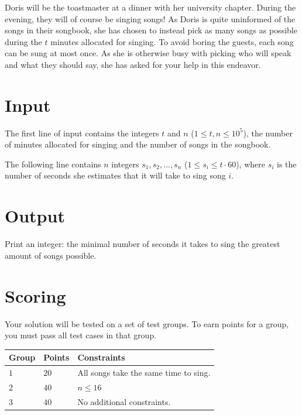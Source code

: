 Doris will be the toastmaster at a dinner with her university chapter.
During the evening, they will of course be singing songs! 
As Doris is quite uninformed of the songs in their songbook, she has chosen to instead pick as many songs as possible during the $t$ minutes allocated for singing. 
To avoid boring the guests, each song can be sung at most once.
As she is otherwise busy with picking who will speak and what they should say, she has asked for your help in this endeavor.

\section*{Input}
The first line of input contains the integers $t$ and $n$ ($1 \leq t,n \leq 10^5$),
the number of minutes allocated for singing and the number of songs in the songbook.

The following line contains $n$ integers $s_1, s_2, \dots, s_n$ ($1 \leq s_i \leq t \cdot 60$),
where $s_i$ is the number of seconds she estimates that it will take to sing song $i$.

\section*{Output}
Print an integer: the minimal number of seconds it takes to sing the greatest amount of songs possible.

\section*{Scoring}
Your solution will be tested on a set of test groups.
To earn points for a group, you must pass all test cases in that group.

\noindent
\begin{tabular}{| l | l | p{12cm} |}
\hline
  \textbf{Group} & \textbf{Points} & \textbf{Constraints} \\ \hline
  $1$    & $20$       &  All songs take the same time to sing.\\ \hline 
  $2$    & $40$       &  $n \leq 16$ \\ \hline
  $3$    & $40$       &  No additional constraints. \\ \hline
\end{tabular}
